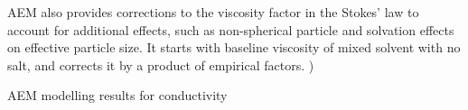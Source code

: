 \documentclass[../main.tex]{subfiles}
\begin{document}
AEM also provides corrections to the viscosity factor in the Stokes' law to account for additional effects, such as non-spherical particle and solvation effects on effective particle size. It starts with baseline viscosity of mixed solvent with no salt, and corrects it by a product of empirical factors. \cite{Gering2006})

AEM modelling results for conductivity 
\end{document}
